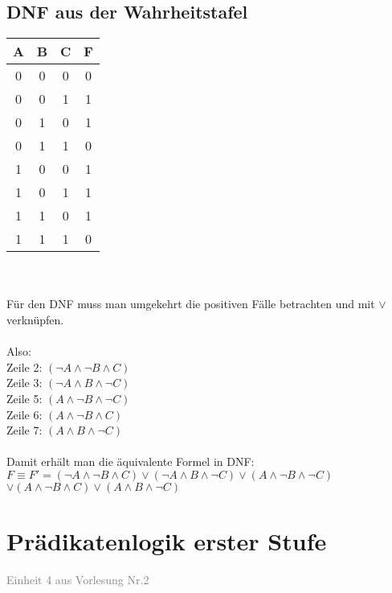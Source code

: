 \documentclass{article}
\begin{document}
\begin{itemize}
		\subsection{DNF aus der Wahrheitstafel}
		\begin{tabular}{c|c|c||c}
			A & B & C & F \\
			\hline
			0 & 0 & 0 & 0 \\
			0 & 0 & 1 & 1 \\
			0 & 1 & 0 & 1 \\
			0 & 1 & 1 & 0 \\
			1 & 0 & 0 & 1 \\
			1 & 0 & 1 & 1 \\
			1 & 1 & 0 & 1 \\
			1 & 1 & 1 & 0 \\
		\end{tabular} \\
		\\
		Für den DNF muss man umgekehrt die positiven Fälle betrachten und mit $\vee$ verknüpfen. \\
		\\
		Also: \\
		Zeile 2: $(\neg A \wedge \neg B \wedge C)$ \\
		Zeile 3: $(\neg A \wedge B \wedge \neg C)$ \\
		Zeile 5: $(A \wedge \neg B \wedge \neg C)$ \\
		Zeile 6: $(A \wedge \neg B \wedge C)$ \\
		Zeile 7: $(A \wedge B \wedge \neg C)$ \\
		\\
		Damit erhält man die äquivalente Formel in DNF: \\
		$F \equiv F' = (\neg A \wedge \neg B \wedge C) \vee (\neg A \wedge B \wedge \neg C) \vee (A \wedge \neg B \wedge \neg C)$\\$ \vee (A \wedge \neg B \wedge C) \vee (A \wedge B \wedge \neg C)$
	\end{itemize}
	\section{Prädikatenlogik erster Stufe}
	\textcolor{gray}{Einheit 4 aus Vorlesung Nr.2}
\end{document}
